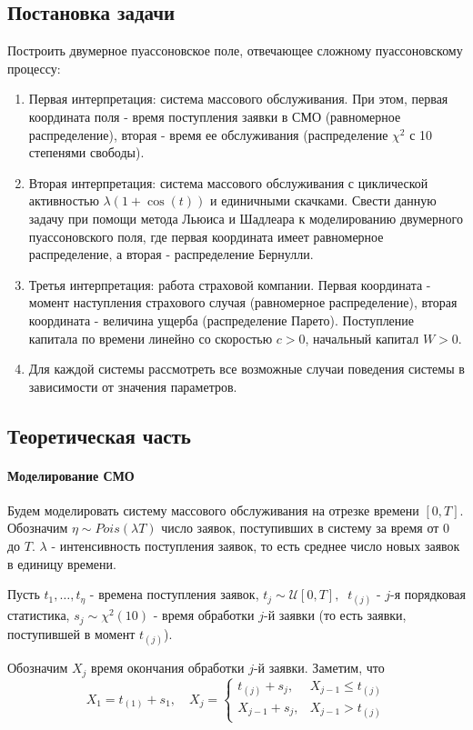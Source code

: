 \documentclass[16pt]{article}
\begin{document}
\subsection{Постановка задачи}
Построить двумерное пуассоновское поле, отвечающее сложному пуассоновскому процессу:
\begin{enumerate}
	\item Первая интерпретация: система массового обслуживания. При этом, первая координата поля - время поступления заявки в СМО (равномерное распределение), вторая - время ее обслуживания (распределение $\chi^2$ с 10 степенями свободы).
	\item Вторая интерпретация: система массового обслуживания с циклической активностью $\lambda(1 + \cos(t))$ и единичными скачками. Свести данную задачу при помощи метода Льюиса и Шадлеара к моделированию двумерного пуассоновского поля, где первая координата имеет равномерное распределение, а вторая - распределение Бернулли.
	\item Третья интерпретация: работа страховой компании. Первая координата - момент наступления страхового случая (равномерное распределение), вторая координата - величина ущерба (распределение Парето). Поступление капитала по времени линейно со скоростью $c > 0$, начальный капитал $W > 0$.
	\item Для каждой системы рассмотреть все возможные случаи поведения системы в зависимости от значения параметров.
\end{enumerate}

\subsection{Теоретическая часть}
\paragraph{Моделирование СМО}
Будем моделировать систему массового обслуживания на отрезке времени $[0, T]$. Обозначим $\eta \sim Pois(\lambda T)$ число заявок, поступивших в систему за время от $0$ до $T$. $\lambda$ - интенсивность поступления заявок, то есть среднее число новых заявок в единицу времени.

Пусть $t_1, \ldots, t_\eta$ - времена поступления заявок, $t_j \sim \mathcal{U}[0, T],\ $ $t_{(j)}$ - $j$-я порядковая статистика, $s_j \sim \chi^2(10)$ - время обработки $j$-й заявки (то есть заявки, поступившей в момент $t_{(j)}$).

Обозначим $X_j$ время окончания обработки $j$-й заявки. Заметим, что
$$X_1 = t_{(1)} + s_1, \quad 
X_j = \begin{cases}
t_{(j)} + s_j, & X_{j - 1} \leq t_{(j)} \\
X_{j-1} + s_j, & X_{j - 1} > t_{(j)}
\end{cases}
$$
\end{document}
